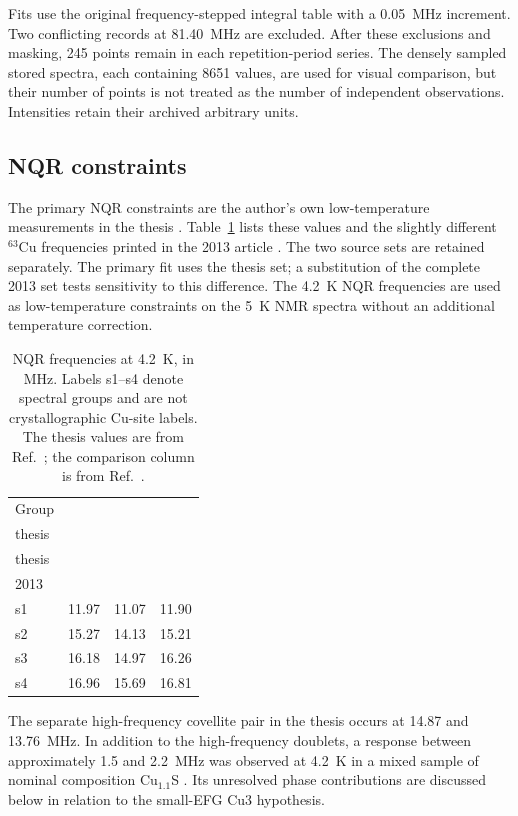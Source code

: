 \documentclass[10pt,a4paper,twocolumn]{article}
\begin{document}
Fits use the original frequency-stepped integral table with a 0.05~MHz increment. Two conflicting records at 81.40~MHz are excluded. After these exclusions and masking, 245 points remain in each repetition-period series. The densely sampled stored spectra, each containing 8651 values, are used for visual comparison, but their number of points is not treated as the number of independent observations. Intensities retain their archived arbitrary units.

\subsection{NQR constraints}

The primary NQR constraints are the author's own low-temperature measurements in the thesis \citep[p.~21]{Evlampiev2009}. Table~\ref{tab:nqr} lists these values and the slightly different $^{63}$Cu frequencies printed in the 2013 article \citep{Gainov2013}. The two source sets are retained separately. The primary fit uses the thesis set; a substitution of the complete 2013 set tests sensitivity to this difference. The 4.2~K NQR frequencies are used as low-temperature constraints on the 5~K NMR spectra without an additional temperature correction.

\begin{table}[t]
\centering
\caption{NQR frequencies at 4.2~K, in MHz. Labels s1--s4 denote spectral groups and are not crystallographic Cu-site labels. The thesis values are from Ref.~; the comparison column is from Ref.~.}
\label{tab:nqr}
\begin{tabular}{lrrr}
\toprule
Group & \shortstack{$^{63}$Cu\\thesis} & \shortstack{$^{65}$Cu\\thesis} & \shortstack{$^{63}$Cu\\2013} \\
\midrule
s1 & 11.97 & 11.07 & 11.90 \\
s2 & 15.27 & 14.13 & 15.21 \\
s3 & 16.18 & 14.97 & 16.26 \\
s4 & 16.96 & 15.69 & 16.81 \\
\bottomrule
\end{tabular}
\end{table}

The separate high-frequency covellite pair in the thesis occurs at 14.87 and 13.76~MHz. In addition to the high-frequency doublets, a response between approximately 1.5 and 2.2~MHz was observed at 4.2~K in a mixed sample of nominal composition Cu$_{1.1}$S \citep[pp.~22--23, Fig.~8]{Evlampiev2009}. Its unresolved phase contributions are discussed below in relation to the small-EFG Cu3 hypothesis.
\end{document}
